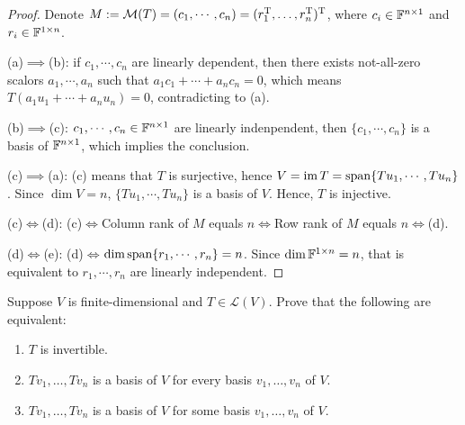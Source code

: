 \documentclass{article}
\begin{document}
\begin{proof}
    Denote \( M:=\mathcal{M }(T )=(c_1,\cdots,c_n)=(r_1^\mathrm{T},\ldots,r_n^\mathrm{T})^\mathrm{T} \), where \( c_i\in\mathbb{F}^{n\times 1} \) and \( r_i\in\mathbb{F}^{1\times n} \). \par
    (a)\(\implies\)(b): if \( c_1,\cdots,c_n \) are linearly dependent, then there exists not-all-zero scalors \( a_1,\cdots,a_n \) such that \( a_1c_1+\cdots+a_nc_n=0 \), which means\( T(a_1u_1+\cdots+a_nu_n)=0 \), contradicting to (a).\par
    (b)\(\implies\)(c): \( c_1,\cdots,c_n\in\mathbb{F}^{n\times 1} \) are linearly indenpendent, then \( \{c_1,\cdots,c_n\} \) is a basis of \( \mathbb{F}^{n\times1} \), which implies the conclusion.\par
    (c)\(\implies\)(a): (c) means that \( T  \) is surjective, hence \( V=\operatorname{im} T=\operatorname{span}\{Tu_1,\cdots,Tu_n\} \). Since \( \dim V=n \), \( \{Tu_1,\cdots,Tu_n\} \) is a basis of \( V \). Hence, \( T  \) is injective. \par
    (c)\( \iff \)(d): (c)\( \iff \)Column rank of \( M  \) equals \( n \)\( \iff \)Row rank of \( M  \) equals \( n \)\( \iff \)(d).\par
    (d)\( \iff \)(e): (d)\( \iff \)\( \dim\operatorname{span}\{r_1,\cdots,r_n\}=n \). Since \( \dim\mathbb{F}^{1\times n}=n \), that is equivalent to \( r_1,\cdots,r_n \) are linearly independent.
\end{proof}

\begin{problem}[3D-3]
    Suppose \( V \) is finite-dimensional and \( T\in\mathcal{L}(V) \). Prove that the following
    are equivalent:
    \begin{enumerate}[label=\textup{(\alph*)}]
        \item \( T \) is invertible.
        \item \( Tv_1,\ldots, Tv_n \) is a basis of \( V \) for every basis \( v_1,\ldots,v_n \) of \( V \).
        \item \( Tv_1,\ldots, Tv_n \) is a basis of \( V \) for some basis \( v_1,\ldots,v_n \) of \( V \).
    \end{enumerate}
\end{problem}
\end{document}
